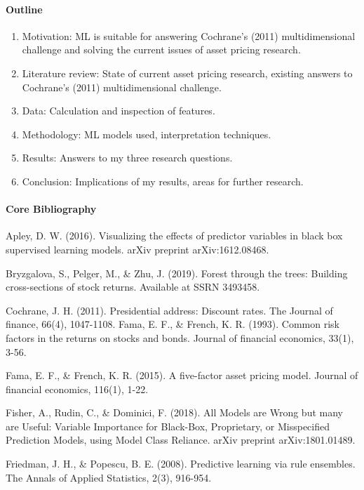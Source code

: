 \paragraph{Outline}

\begin{enumerate}
\item	Motivation: ML is suitable for answering Cochrane’s (2011) multidimensional challenge and solving the current issues of asset pricing research. 
\item	Literature review: State of current asset pricing research, existing answers to Cochrane’s (2011) multidimensional challenge.
\item	Data: Calculation and inspection of features.
\item	Methodology: ML models used, interpretation techniques. 
\item	Results: Answers to my three research questions. 
\item	Conclusion: Implications of my results, areas for further research.  
\end{enumerate}


\paragraph{Core Bibliography}

Apley, D. W. (2016). Visualizing the effects of predictor variables in black box supervised learning models. arXiv preprint arXiv:1612.08468.

Bryzgalova, S., Pelger, M., \& Zhu, J. (2019). Forest through the trees: Building cross-sections of stock returns. Available at SSRN 3493458.

Cochrane, J. H. (2011). Presidential address: Discount rates. The Journal of finance, 66(4), 1047-1108.
Fama, E. F., \& French, K. R. (1993). Common risk factors in the returns on stocks and bonds. Journal of financial economics, 33(1), 3-56.

Fama, E. F., \& French, K. R. (2015). A five-factor asset pricing model. Journal of financial economics, 116(1), 1-22.

Fisher, A., Rudin, C., \& Dominici, F. (2018). All Models are Wrong but many are Useful: Variable Importance for Black-Box, Proprietary, or Misspecified Prediction Models, using Model Class Reliance. arXiv preprint arXiv:1801.01489.

Friedman, J. H., \& Popescu, B. E. (2008). Predictive learning via rule ensembles. The Annals of Applied Statistics, 2(3), 916-954.

